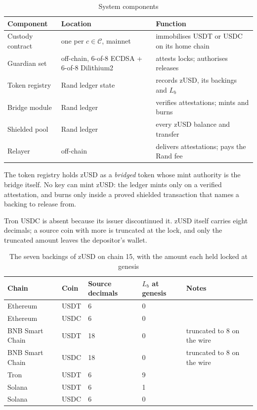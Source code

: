 \documentclass[11pt,a4paper]{article}
\begin{document}
\begin{table}[H]
\centering
\caption{System components}
\footnotesize
\setlength{\tabcolsep}{2.5pt}
\begin{tabular}{@{}lll@{}}
\toprule
\textbf{Component} & \textbf{Location} & \textbf{Function} \\ \midrule
Custody contract & one per $c \in \mathcal{C}$, mainnet & immobilises USDT or USDC on its home chain \\
Guardian set & off-chain, 6-of-8 ECDSA + 6-of-8 Dilithium2 & attests locks; authorises releases \\
Token registry & Rand ledger state & records zUSD, its backings and $L_b$ \\
Bridge module & Rand ledger & verifies attestations; mints and burns \\
Shielded pool & Rand ledger & every zUSD balance and transfer \\
Relayer & off-chain & delivers attestations; pays the Rand fee \\ \bottomrule
\end{tabular}
\end{table}

The token registry holds zUSD as a \emph{bridged} token whose mint authority is the bridge itself. No key can mint zUSD: the ledger mints only on a verified attestation, and burns only inside a proved shielded transaction that names a backing to release from.

Tron USDC is absent because its issuer discontinued it. zUSD itself carries eight decimals; a source coin with more is truncated at the lock, and only the truncated amount leaves the depositor's wallet.

\begin{table}[t]
\centering
\caption{The seven backings of zUSD on chain 15, with the amount each held locked at genesis}
\label{tab:backings}
\begin{tabular}{@{}lllll@{}}
\toprule
\textbf{Chain} & \textbf{Coin} & \textbf{Source decimals} & \textbf{$L_b$ at genesis} & \textbf{Notes} \\ \midrule
Ethereum & USDT & 6 & 0 & \\
Ethereum & USDC & 6 & 0 & \\
BNB Smart Chain & USDT & 18 & 0 & truncated to 8 on the wire \\
BNB Smart Chain & USDC & 18 & 0 & truncated to 8 on the wire \\
Tron & USDT & 6 & 9 & \\
Solana & USDT & 6 & 1 & \\
Solana & USDC & 6 & 0 & \\ \bottomrule
\end{tabular}
\end{table}
\end{document}
